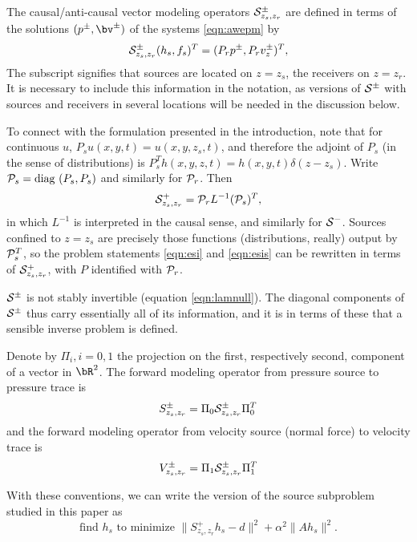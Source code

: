 The causal/anti-causal vector
modeling operators ${\cal S}^{\pm}_{z_s,z_r}$ are defined in terms of
the solutions $(p^{\pm},\bv^{\pm})$ of the systems \ref{eqn:awepm} by
\begin{equation}
  {\cal S}^{\pm}_{z_s,z_r}(h_s,f_s)^T  = (P_rp^{\pm},P_r v_z^{\pm})^T,
  \label{eqn:fwd}
\end{equation}
The subscript signifies that sources are located on $z=z_s$, the
receivers on $z=z_r$. It is necessary to include this information in
the notation, as versions of ${\cal S}^{\pm}$ with sources and receivers in
several locations will be needed in the discussion below.

 To connect with the formulation presented in
the introduction, note that for continuous $u$,
$P_su(x,y,t)=u(x,y,z_s,t)$, and therefore the adjoint of $P_s$ (in the
sense of distributions) is $P_s^Th(x,y,z,t) =
h(x,y,t)\delta(z-z_s)$. Write ${\cal P}_s = \mbox{diag }(P_s,P_s)$ and
similarly for ${\cal P}_r$. Then
\[
  {\cal S}^{+}_{z_s,z_r} = {\cal P}_r L^{-1}({\cal P}_s)^T,
\]
in which $L^{-1}$ is interpreted in the causal sense, and similarly
for ${\cal S}^{-}$. Sources confined to $z=z_s$ are precisely those
functions (distributions, really) output by ${\cal P}_s^T$, so the
problem statements \ref{eqn:esi} and \ref{eqn:esis} can be rewritten
in terms of ${\cal S}^+_{z_s,z_r}$, with $P$ identified with ${\cal P}_r$.

${\cal S}^{\pm}$ is not stably invertible (equation \ref{eqn:lamnull}). The
diagonal components of ${\cal S}^{\pm}$ thus carry essentially all of
its information, and it is in terms of these that a sensible inverse problem
is defined.

Denote by $\Pi_i, i=0,1$ the projection on the first,
respectively second, component of a vector in $\bR^2$. The 
forward modeling operator from pressure source to pressure trace is
\begin{equation}
  \label{eqn:sdef}
  S^{\pm}_{z_s,z_r} = \Pi_0 {\cal S}^{\pm}_{z_s,z_r} \Pi_0^T 
\end{equation}
and the forward modeling operator from velocity source (normal force)
to velocity trace is
\begin{equation}
  \label{eqn:vdef}
  V^{\pm}_{z_s,z_r} = \Pi_1 {\cal S}^{\pm}_{z_s,z_r} \Pi_1^T 
\end{equation}

With these conventions, we can write the version of the source
subproblem studied in this paper as
\begin{equation}
  \label{eqn:esisp}
  \mbox{find }h_s\mbox{ to minimize }\|S^{+}_{z_s,z_r}h_s- d\|^2 +
  \alpha^2\|Ah_s\|^2.
\end{equation}

